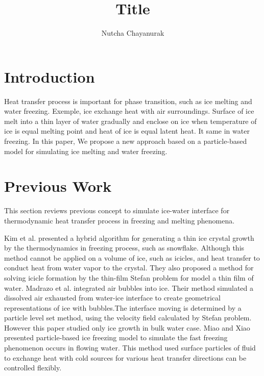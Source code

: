 \documentclass[10pt, twocolumn] {IEEEtran}
\begin{document}
\title{Title}
\author{Nutcha Chayanurak}
\maketitle
\begin{abstract} 
 \end{abstract}
\section{Introduction}
Heat transfer process is important for phase transition, such as ice melting and water freezing. Exemple, ice exchange heat with air surroundings. Surface of ice melt into a thin layer of water  gradually and enclose on ice when temperature of ice is equal melting point and heat of ice is equal latent heat. It same in water freezing. In this paper, We propose a new approach based on
a particle-based model for simulating ice melting and water freezing.
\section{Previous Work}
This section reviews previous concept to simulate ice-water interface for thermodynamic heat transfer process in freezing and melting phenomena. 

Kim et al.\cite{kim2004hybrid} presented a hybrid algorithm for generating a thin ice crystal growth by the thermodynamics in freezing process, such as snowflake. Although this method cannot be applied on a volume of ice, such as icicles, and heat transfer to conduct heat from water vapor to the crystal. They also proposed a method for solving icicle formation by the thin-film Stefan problem for model a thin film of water\cite{kim2006modeling}. Madrazo et al. integrated air bubbles into ice\cite{madrazo2009air}. Their method simulated a dissolved air exhausted from water-ice interface to create geometrical representations of ice with bubbles.The interface moving is determined by a particle level set method, using the velocity field calculated by Stefan problem. However this paper studied only ice growth in bulk water case. Miao and Xiao\cite{Miao:2015:PIF:2817675.2817676} presented particle-based ice freezing model to simulate the fast freezing phenomenon occurs in flowing water. This method used surface particles of fluid to exchange heat with cold sources for various heat transfer directions can be controlled flexibly.
 
\end{document}
